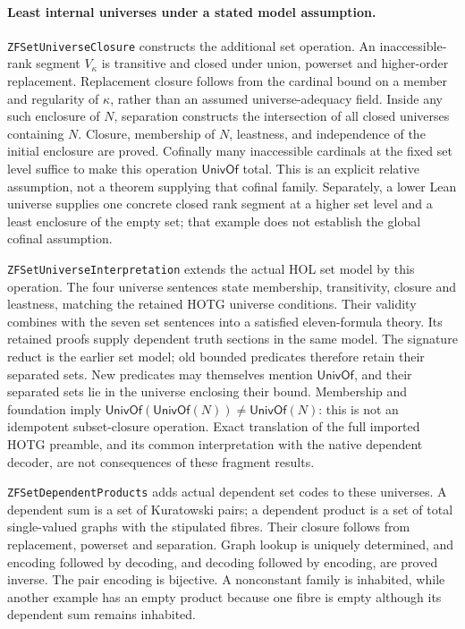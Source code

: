 \documentclass[11pt]{article}
\theoremstyle{definition}
\theoremstyle{remark}
\begin{document}
\paragraph{Least internal universes under a stated model assumption.}
\nolinkurl{ZFSetUniverseClosure} constructs the additional set operation.
An inaccessible-rank segment \(V_\kappa\) is transitive and closed under
union, powerset and higher-order replacement. Replacement closure follows
from the cardinal bound on a member and regularity of \(\kappa\), rather
than an assumed universe-adequacy field. Inside any such enclosure of \(N\),
separation constructs the intersection of all closed universes containing
\(N\). Closure, membership of \(N\), leastness, and independence of the
initial enclosure are proved. Cofinally many inaccessible cardinals at the
fixed set level suffice to make this operation \(\mathsf{UnivOf}\) total.
This is an explicit relative assumption, not a theorem supplying that
cofinal family. Separately, a lower Lean universe supplies one concrete
closed rank segment at a higher set level and a least enclosure of the empty
set; that example does not establish the global cofinal assumption.

\nolinkurl{ZFSetUniverseInterpretation} extends the actual HOL set model by
this operation. The four universe sentences state membership, transitivity,
closure and leastness, matching the retained HOTG universe conditions. Their
validity combines with the seven set sentences into a satisfied eleven-formula
theory. Its retained proofs supply dependent truth sections in the same
model. The signature reduct is the earlier set model; old bounded predicates
therefore retain their separated sets. New predicates may themselves mention
\(\mathsf{UnivOf}\), and their separated sets lie in the universe enclosing
their bound. Membership and foundation imply
\(\mathsf{UnivOf}(\mathsf{UnivOf}(N))\ne\mathsf{UnivOf}(N)\): this is
not an idempotent subset-closure operation. Exact translation of the full
imported HOTG preamble, and its common interpretation with the native
dependent decoder, are not consequences of these fragment results.

\nolinkurl{ZFSetDependentProducts} adds actual dependent set codes to
these universes. A dependent sum is a set of Kuratowski pairs; a dependent
product is a set of total single-valued graphs with the stipulated fibres.
Their closure follows from replacement, powerset and separation. Graph
lookup is uniquely determined, and encoding followed by decoding, and
decoding followed by encoding, are proved inverse. The pair encoding is
bijective. A nonconstant family is inhabited, while another example has
an empty product because one fibre is empty although its dependent sum
remains inhabited.
\end{document}
